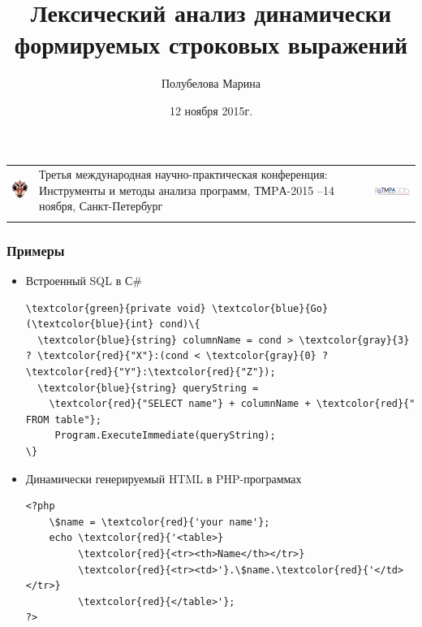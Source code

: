 \documentclass{beamer}
\title[]{Лексический анализ динамически формируемых строковых выражений}
\institute[СПбГУ]{
Санкт-Петербургский государственный университет}
\author[Полубелова Марина]{Полубелова Марина}
\date{12 ноября 2015г.}
\begin{document}
\begin{frame}
    \begin{tabular}[c c c]{m{2cm} m{5.5cm} m{3cm}}
        \begin{center}
        \includegraphics[width=1.3cm]{SPbGU_Logo.png}
    \end{center}
    &
    Третья международная научно-практическая конференция: \newline Инструменты и методы анализа программ, ТМPА-2015
    \newline
    12--14 ноября, Санкт-Петербург
    &
    \begin{center}
        \includegraphics[width=3cm]{tmpa2015_logo.png}
    \end{center}
    \\
    &&
    \end{tabular}
    \titlepage
\end{frame}


\begin{frame}[fragile]
\transwipe[direction=90]
\frametitle{Примеры}
\begin{itemize}

\item Встроенный SQL в С\#
\begin{Verbatim}[commandchars=\\\{\}]
\textcolor{green}{private void} \textcolor{blue}{Go} (\textcolor{blue}{int} cond)\{
  \textcolor{blue}{string} columnName = cond > \textcolor{gray}{3} ? \textcolor{red}{"X"}:(cond < \textcolor{gray}{0} ? \textcolor{red}{"Y"}:\textcolor{red}{"Z"});
  \textcolor{blue}{string} queryString = 
    \textcolor{red}{"SELECT name"} + columnName + \textcolor{red}{" FROM table"};
     Program.ExecuteImmediate(queryString);
\}
\end{Verbatim}
        
\item Динамически генерируемый HTML в PHP-программах
\begin{Verbatim}[commandchars=\\\{\}]   
<?php 
    \$name = \textcolor{red}{'your name'};
    echo \textcolor{red}{'<table>} 
         \textcolor{red}{<tr><th>Name</th></tr>}  
         \textcolor{red}{<tr><td>'}.\$name.\textcolor{red}{'</td></tr>} 
         \textcolor{red}{</table>'};
?>
\end{Verbatim}
\end{itemize}
\end{frame}
\end{document}
